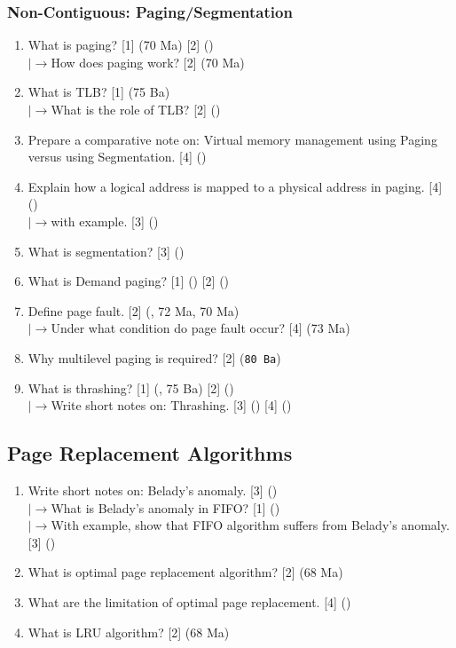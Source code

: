 \documentclass[12pt]{article}
\newcommand{\lb}{\\$\left|\rightarrow\right.$}
\begin{document}
			\subsubsection{Non-Contiguous: Paging/Segmentation}
				\begin{enumerate}[topsep=0pt]
					\item What is paging? \hfill [1] (70 Ma) [2] ()
					\lb How does paging work? \hfill [2] (70 Ma)
					
					\item What is TLB? \hfill [1] (75 Ba)
					\lb What is the role of TLB? \hfill [2] ()

					\item Prepare a comparative note on: Virtual memory management using Paging versus using Segmentation. \hfill [4] ()
				
					\item Explain how a logical address is mapped to a physical address in paging. \hfill [4] ()
				\lb with example. \hfill [3] ()

					\item What is segmentation? \hfill [3] ()
				
					\item What is Demand paging? \hfill [1] () [2] ()
					
					\item Define page fault. \hfill [2] (, 72 Ma, 70 Ma)
					\lb Under what condition do page fault occur? \hfill [4] (73 Ma)

					\item Why multilevel paging is required? \hfill [2] (\texttt{80 Ba})
					
					\item What is thrashing? \hfill [1] (, 75 Ba) [2] ()
					\lb Write short notes on: Thrashing. \hfill [3] () [4] ()
				\end{enumerate}
		
	\subsection{Page Replacement Algorithms}
		\begin{enumerate}[noitemsep, topsep=0pt]
			\item Write short notes on: Belady's anomaly. \hfill [3] ()
			\lb What is Belady's anomaly in FIFO? \hfill [1] ()
			\lb With example, show that FIFO algorithm suffers from Belady's anomaly. \hfill [3] ()



			\item What is optimal page replacement algorithm? \hfill [2] (68 Ma)

			\item What are the limitation of optimal page replacement. \hfill [4] ()

			\item What is LRU algorithm? \hfill [2] (68 Ma)
		\end{enumerate}
		
\end{document}
